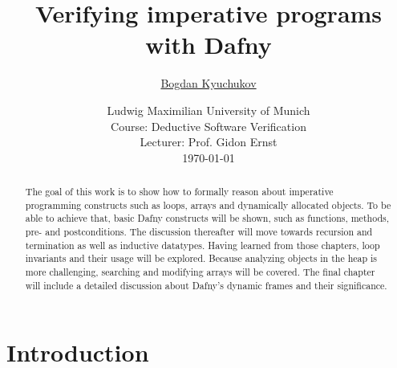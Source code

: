 \documentclass[a4paper]{article}
\begin{document}
\title{
	\vspace{1cm}
	\Huge Verifying imperative programs \\ with Dafny \\
}

\vspace{1cm}

\author{\Large \href{mailto:B.Kyuchukov@campus.lmu.de}{Bogdan Kyuchukov}
	\vspace{1cm}}

\date{
	\large Ludwig Maximilian University of Munich \\ Course: Deductive Software Verification \\
	\vspace{0.8cm}
	\large Lecturer: Prof. Gidon Ernst\\
	\vspace{1cm}
	\today
}

\maketitle
\setlength{\parindent}{0pt}

\vspace{2cm}
\begin{abstract}
	The goal of this work is to show how to formally reason
	about imperative programming constructs such as
	loops, arrays and dynamically allocated objects. To be able to achieve that, basic
	Dafny constructs will be shown, such as functions, methods, pre- and postconditions. The discussion thereafter will move
	towards recursion and termination as well as inductive datatypes. Having learned from those chapters,
	loop invariants and their usage will be explored. Because analyzing objects in the heap is more challenging,
	searching and modifying arrays will be covered. The final chapter will include a detailed discussion about Dafny's
	dynamic frames and their significance.
\end{abstract}
\newpage
\tableofcontents
\newpage

\section{Introduction} %
\label{sec:introduction}
\end{document}
